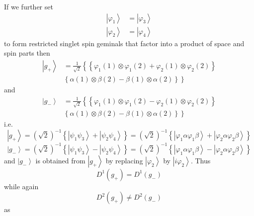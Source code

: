 \documentclass[aps,preprint]{revtex4}%
\begin{document}
If we further set
\begin{align}
\left\vert \varphi_{1}\right\rangle  &  =\left\vert \varphi_{3}\right\rangle
\nonumber\\
\left\vert \varphi_{2}\right\rangle  &  =\left\vert \varphi_{4}\right\rangle
\end{align}
to form restricted singlet spin geminals that factor into a product of space
and spin parts then
\begin{align}
\left\vert g_{+}\right\rangle  &  =\frac{1}{\sqrt{2}}\left\{  \overset{}%
{}\left\{  \varphi_{1}\left(  1\right)  \otimes\varphi_{1}\left(  2\right)
+\varphi_{2}\left(  1\right)  \otimes\varphi_{2}\left(  2\right)  \right\}
\right. \nonumber\\
&  \left.  \left\{  \alpha\left(  1\right)  \otimes\beta\left(  2\right)
-\beta\left(  1\right)  \otimes\alpha\left(  2\right)  \right\}  \overset{}%
{}\right\}
\end{align}
and
\begin{align}
\left\vert g_{-}\right\rangle  &  =\frac{1}{\sqrt{2}}\left\{  \overset{}%
{}\left\{  \varphi_{1}\left(  1\right)  \otimes\varphi_{1}\left(  2\right)
-\varphi_{2}\left(  1\right)  \otimes\varphi_{2}\left(  2\right)  \right\}
\right. \nonumber\\
&  \left.  \left\{  \alpha\left(  1\right)  \otimes\beta\left(  2\right)
-\beta\left(  1\right)  \otimes\alpha\left(  2\right)  \right\}  \overset{}%
{}\right\}
\end{align}
i.e.
\[
\left\vert g_{+}\right\rangle =\left(  \sqrt{2}\right)  ^{-1}\left\{
\left\vert \psi_{1}\psi_{3}\right\rangle +\left\vert \psi_{2}\psi
_{4}\right\rangle \right\}  =\left(  \sqrt{2}\right)  ^{-1}\left\{  \left\vert
\varphi_{1}\alpha\varphi_{1}\beta\right\rangle +\left\vert \varphi_{2}%
\alpha\varphi_{2}\beta\right\rangle \right\}
\]%
\[
\left\vert g_{-}\right\rangle =\left(  \sqrt{2}\right)  ^{-1}\left\{
\left\vert \psi_{1}\psi_{3}\right\rangle -\left\vert \psi_{2}\psi
_{4}\right\rangle \right\}  =\left(  \sqrt{2}\right)  ^{-1}\left\{  \left\vert
\varphi_{1}\alpha\varphi_{1}\beta\right\rangle -\left\vert \varphi_{2}%
\alpha\varphi_{2}\beta\right\rangle \right\}
\]
and $\left\vert g_{-}\right\rangle $ is obtained from $\left\vert
g_{+}\right\rangle $ by replacing $\left\vert \varphi_{2}\right\rangle $ by
$\left\vert i\varphi_{2}\right\rangle $. Thus
\[
D^{1}\left(  g_{+}\right)  =D^{1}\left(  g_{-}\right)
\]
while again
\[
D^{2}\left(  g_{+}\right)  \neq D^{2}\left(  g_{-}\right)
\]
as
\end{document}
